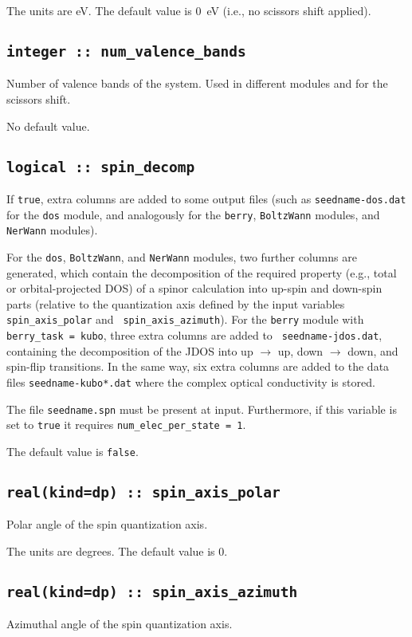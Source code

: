 The units are eV. The default value is 0~eV (i.e., no scissors shift applied).

  \subsection{\tt integer :: num\_valence\_bands} 
Number of valence bands of the system. Used in different modules and
for the scissors shift.

No default value.


\subsection[spin\_decomp]{\tt logical :: spin\_decomp}
If {\tt true}, extra columns are added to some output files (such as
{\tt seedname-dos.dat} for the {\tt dos} module, and analogously for
the {\tt berry}, {\tt BoltzWann} modules, and {\tt NerWann} modules).

For the {\tt dos}, {\tt BoltzWann}, and {\tt NerWann} modules, two further columns are
generated, which contain the decomposition of the required property
(e.g., total or orbital-projected DOS) of a spinor calculation into
up-spin and down-spin parts (relative to the quantization axis defined
by the input variables {\tt spin\_axis\_polar} and {\tt
  spin\_axis\_azimuth}).  For the {\tt berry} module with {\tt
  berry\_task = kubo}, three extra columns are added to {\tt
  seedname-jdos.dat}, containing the decomposition of the JDOS into up
$\rightarrow$ up, down $\rightarrow$ down, and spin-flip
transitions. In the same way, six extra columns are added to the data
files {\tt seedname-kubo*.dat} where the complex optical conductivity
is stored.

The file {\tt seedname.spn} must be present at input. Furthermore, if
this variable is set to \verb#true# it
requires {\tt num\_elec\_per\_state = 1}.

The default value is \verb#false#.

  \subsection{\tt real(kind=dp) :: spin\_axis\_polar}
Polar angle of the spin quantization axis.

The units are degrees. The default value is 0.

\subsection{\tt real(kind=dp) :: spin\_axis\_azimuth}
Azimuthal angle of the spin quantization axis. 


